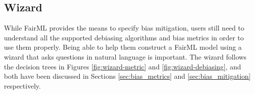 \documentclass[sigconf,review]{acmart}
\begin{document}
{		%
		
		\subsection{Wizard}
		\label{sec:wizard}
		While FairML provides the means to specify bias mitigation, users still need to understand all the supported debiasing algorithms and bias metrics in order to use them properly. Being able to help them construct a FairML model using a wizard that asks questions in natural language is important. The wizard follows the decision trees in Figures \ref{fig:wizard-metric} and \ref{fig:wizard-debiasing}, and both have been discussed in Sections \ref{sec:bias_metrics} and \ref{sec:bias_mitigation} respectively.
	
}
\end{document}
